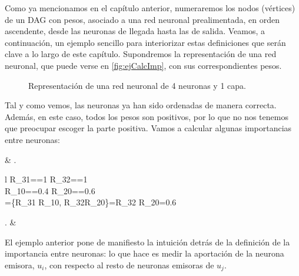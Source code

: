 \documentclass[12pt, a4paper, twoside]{book}
\numberwithin{equation}{section}
\theoremstyle{definition}
\newenvironment{ejem}
  {\pushQED{\qed}\renewcommand{\qedsymbol}{$\blacktriangleleft$}\ejemplo}
  {\popQED\endejemplo}
\theoremstyle{remark}
\theoremstyle{plain}
\begin{document}
	Como ya mencionamos en el capítulo anterior, numeraremos los nodos 
	(vértices) de un DAG con pesos, asociado a una red neuronal 
	prealimentada, en orden ascendente, desde las neuronas de llegada 
	hasta las de salida. Veamos, a continuación, un ejemplo sencillo para 
	interiorizar estas definiciones que serán clave a lo largo de este 
	capítulo.
	\begin{ejem}
		\label{ej:primerRel}	
		Supondremos la representación de una red neuronal, que puede 
		verse en \autoref{fig:ejCalcImp}, con sus correspondientes 
		pesos.

		\begin{figure}[!htbp]
			\centering
			\caption{Representación de una red neuronal de 4 neuronas y 1 capa.}
			\label{fig:ejCalcImp}
		\end{figure}
		
		Tal y como vemos, las neuronas ya han sido ordenadas de manera 
		correcta. Además, en este caso, todos los pesos son positivos, 
		por lo que no nos tenemos que preocupar escoger la parte 
		positiva. Vamos a calcular algunas importancias entre 
		neuronas:			
		\begin{flalign*}
			& \left.
				\begin{array}{l}
					R_{31}==1 \hspace{0.5cm} R_{32}==1 \\[3pt]
					R_{10}==0.4 \hspace{0.55cm}  R_{20}==0.6 \\[3pt]
					=\max\{R_{31} \cdot R_{10}, R_{32}\cdot R_{20}\}=R_{32} \cdot R_{20}=0.6  
				\end{array}
			\right. & 
		\end{flalign*}
	\end{ejem}
	El ejemplo anterior pone de manifiesto la intuición detrás de la 
	definición de la importancia entre neuronas: lo que hace es medir 
	la aportación de la neurona emisora, $u_{i}$, con respecto al resto de 
	neuronas emisoras de $u_{j}$.
	
\end{document}
